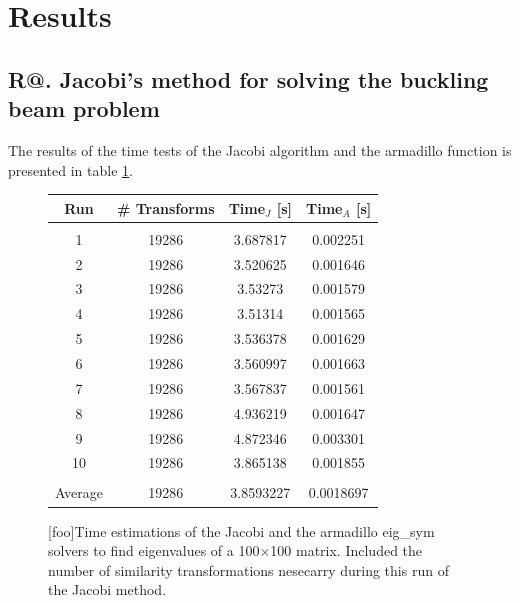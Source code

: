 \documentclass[%
reprint,
amsmath,amssymb,
aps,
]{revtex4-1}
\makeatletter
\newcommand*{\rom}[1]{\expandafter\@slowromancap\romannumeral #1@}
\makeatother
\begin{document}
\section*{Results}
\subsection*{R\rom{1}. Jacobi's method for solving the buckling beam problem} \noindent 
The results of the time tests of the Jacobi algorithm and the armadillo function is presented in table \ref{tab1}.
\begin{figure}[H]
	\centering 
	\begin{tabular} {|c|c|c|c|}
		\hline
		Run & \# Transforms & Time$_J$ [s] & Time$_A$ [s] \\ 
		\hline
		&&& \\ 
		1 & 19286 & 3.687817             & 0.002251            \\ 
		2 & 19286 & 3.520625             & 0.001646            \\ 
		3 & 19286 & 3.53273             & 0.001579            \\ 
		4 & 19286 & 3.51314             & 0.001565            \\ 
		5 & 19286 & 3.536378             & 0.001629            \\ 
		6 & 19286 & 3.560997             & 0.001663            \\ 
		7 & 19286 & 3.567837             & 0.001561            \\ 
		8 & 19286 & 4.936219             & 0.001647            \\ 
		9 & 19286 & 4.872346             & 0.003301            \\ 
		10 & 19286 & 3.865138             & 0.001855            \\ 
		\hline 
		& && \\
		Average &19286& 3.8593227&0.0018697\\ 
		\hline
	\end{tabular}
	[foo]{Time estimations of the Jacobi and the armadillo eig\_sym solvers to find eigenvalues of a 100$\times$100 matrix. Included the number of similarity transformations nesecarry during this run of the Jacobi method. \label{tab1}}
\end{figure}
\end{document}

